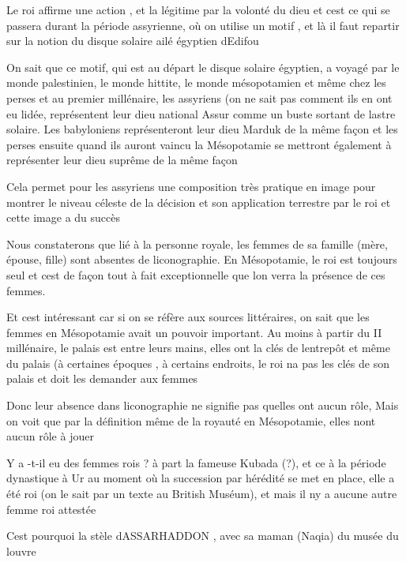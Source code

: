 \documentclass{article}
\begin{document}
Le roi affirme une action , et la légitime par la volonté du dieu et
c{\textquotesingle}est ce qui se passera durant la période assyrienne,
où on utilise un motif , et là il faut repartir sur la notion du disque
solaire ailé égyptien d{\textquotesingle}Edifou

On sait que ce motif, qui est au départ le disque solaire égyptien, a
voyagé par le monde palestinien, le monde hittite, le monde
mésopotamien et même chez les perses et au premier millénaire, les
assyriens (on ne sait pas comment ils en ont eu
l{\textquotesingle}idée, représentent leur dieu national Assur comme un
buste sortant de l{\textquotesingle}astre solaire. Les babyloniens
représenteront leur dieu Marduk de la même façon et les perses ensuite
quand ils auront vaincu la Mésopotamie se mettront également à
représenter leur dieu suprême de la même façon

\newline
Cela permet pour les assyriens une composition très pratique en image
pour montrer le niveau céleste de la décision et son application 
terrestre par le roi et cette image a du succès

Nous constaterons que lié à la personne royale, les femmes de sa famille
(mère, épouse, fille) sont absentes de l{\textquotesingle}iconographie.
En Mésopotamie, le roi est toujours seul et c{\textquotesingle}est de
façon tout à fait exceptionnelle que l{\textquotesingle}on verra la 
présence de ces femmes.

Et c{\textquotesingle}est intéressant car si on se réfère aux sources
littéraires, on sait que les femmes en Mésopotamie avait un pouvoir
important. Au moins à partir du II millénaire, le palais est entre
leurs mains, elles ont la clés de l{\textquotesingle}entrepôt et même
du palais (à certaines époques , à certains endroits, le roi
n{\textquotesingle}a pas les clés de son palais et doit les demander
aux femmes

Donc leur absence dans l{\textquotesingle}iconographie ne signifie pas
qu{\textquotesingle}elles ont aucun rôle,  Mais on voit que par la
définition même de la royauté en Mésopotamie, elles
n{\textquotesingle}ont aucun rôle à jouer

Y a -t-il eu des femmes rois ?  à part la fameuse Kubada (?),  et ce à
la période dynastique à Ur au moment où la succession par hérédité se
met en place, elle a été roi (on le sait par un texte au British
Muséum), et mais il n{\textquotesingle}y a aucune autre femme roi
attestée

C{\textquotesingle}est pourquoi la stèle d{\textquotesingle}ASSARHADDON
,  avec sa maman (Naqi{\textquotesingle}a) du musée du louvre 
\end{document}
